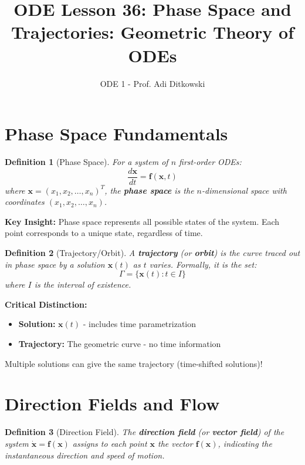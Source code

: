 \documentclass[12pt]{article}
\title{ODE Lesson 36: Phase Space and Trajectories: Geometric Theory of ODEs}
\author{ODE 1 - Prof. Adi Ditkowski}
\date{}
\newtheorem{definition}{Definition}
\begin{document}
\maketitle

\section{Phase Space Fundamentals}

\begin{definition}[Phase Space]
For a system of $n$ first-order ODEs:
$$\frac{d\mathbf{x}}{dt} = \mathbf{f}(\mathbf{x}, t)$$
where $\mathbf{x} = (x_1, x_2, \ldots, x_n)^T$, the \textbf{phase space} is the $n$-dimensional space with coordinates $(x_1, x_2, \ldots, x_n)$.
\end{definition}

\begin{keypoint}
\textbf{Key Insight:} Phase space represents all possible states of the system. Each point corresponds to a unique state, regardless of time.
\end{keypoint}

\begin{definition}[Trajectory/Orbit]
A \textbf{trajectory} (or \textbf{orbit}) is the curve traced out in phase space by a solution $\mathbf{x}(t)$ as $t$ varies. Formally, it is the set:
$$\Gamma = \{\mathbf{x}(t) : t \in I\}$$
where $I$ is the interval of existence.
\end{definition}

\begin{warning}
\textbf{Critical Distinction:}
\begin{itemize}
    \item \textbf{Solution:} $\mathbf{x}(t)$ - includes time parametrization
    \item \textbf{Trajectory:} The geometric curve - no time information
\end{itemize}
Multiple solutions can give the same trajectory (time-shifted solutions)!
\end{warning}

\section{Direction Fields and Flow}

\begin{definition}[Direction Field]
The \textbf{direction field} (or \textbf{vector field}) of the system $\dot{\mathbf{x}} = \mathbf{f}(\mathbf{x})$ assigns to each point $\mathbf{x}$ the vector $\mathbf{f}(\mathbf{x})$, indicating the instantaneous direction and speed of motion.
\end{definition}
\end{document}
